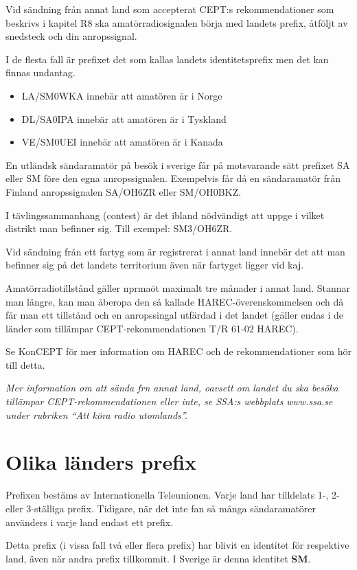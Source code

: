 Vid sändning från annat land som accepterat CEPT:s rekommendationer
som beskrivs i kapitel R8 ska amatörradiosignalen börja med landets
prefix, åtföljt av snedsteck och din anropssignal.

I de flesta fall är prefixet det som kallas landets identitetsprefix
men det kan finnas undantag.

\begin{itemize}
\item LA/SM0WKA innebär att amatören är i Norge
\item DL/SA0IPA innebär att amatören är i Tyskland
\item VE/SM0UEI innebär att amatören är i Kanada
\end{itemize}

En utländsk sändaramatör på besök i sverige får på motsvarande sätt
prefixet SA eller SM före den egna anropssignalen. Exempelvis får då
en sändaramatör från Finland anropssignalen SA/OH6ZR eller SM/OH0BKZ.

I tävlingssammanhang (contest) är det ibland nödvändigt att uppge i
vilket distrikt man befinner sig. Till exempel: SM3/OH6ZR.

Vid sändning från ett fartyg som är registrerat i annat land innebär
det att man befinner sig på det landets territorium även när fartyget
ligger vid kaj.

Amatörradiotillstånd gäller nprmaöt maximalt tre månader i annat land.
Stannar man längre, kan man åberopa den så kallade
HAREC-överenskommelsen och då får man ett tillstånd och en
anropssingal utfärdad i det landet (gäller endas i de länder som
tillämpar CEPT-rekommendationen T/R 61-02 HAREC).

Se KonCEPT för mer information om HAREC och de rekommendationer som
hör till detta.

\emph{Mer information om att sända frn annat land, oavsett om landet
  du ska besöka tillämpar CEPT-re\-kom\-men\-da\-tio\-n\-en eller inte, se SSA:s
  webbplats www.ssa.se under rubriken ``Att köra radio utomlands''.}

\section{Olika länders prefix}

Prefixen bestäms av Internationella Teleunionen. Varje land har
tilldelats 1-, 2- eller 3-ställiga prefix. Tidigare, när det inte fan
så många sändaramatörer använders i varje land endast ett prefix.

Detta prefix (i vissa fall två eller flera prefix) har blivit en
identitet för respektive land, även när andra prefix tillkommit. I
Sverige är denna identitet \textbf{SM}.

